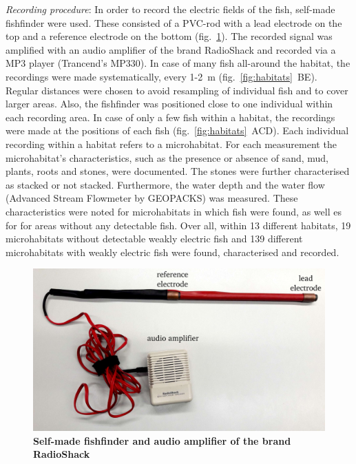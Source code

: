\textit{Recording procedure}: In order to record the electric fields of the fish, self-made fishfinder were used. These consisted of a PVC-rod with a lead electrode on the top and a reference electrode on the bottom (fig.~\ref{fig:fishfinder}). The recorded signal was amplified with an audio amplifier of the brand RadioShack and recorded via a MP3 player (Trancend’s MP330).
In case of many fish all-around the habitat, the recordings were made systematically, every 1-2~m (fig.~\ref{fig:habitats}~BE). Regular distances were chosen to avoid resampling of individual fish and to cover larger areas. Also, the fishfinder was positioned close to one individual within each recording area. In case of only a few fish within a habitat, the recordings were made at the positions of each fish (fig.~\ref{fig:habitats}~ACD). Each individual recording within a habitat refers to a microhabitat. For each measurement the microhabitat’s characteristics, such as the presence or absence of sand, mud, plants, roots and stones, were documented. The stones were further characterised as stacked or not stacked. Furthermore, the water depth and the water flow (Advanced Stream Flowmeter by GEOPACKS) was measured. These characteristics were noted for microhabitats in which fish were found, as well es for for areas without any detectable fish.
Over all, within 13 different habitats, 19 microhabitats without detectable weakly electric fish and 139 different microhabitats with weakly electric fish were found, characterised and recorded.

\begin{figure}[H]
    \centering
    \includegraphics[width=\textwidth]{pictures/Methods/fishfinder.png}
    \caption{\textbf{Self-made fishfinder and audio amplifier of the brand RadioShack}}
    \label{fig:fishfinder}
\end{figure}{}


